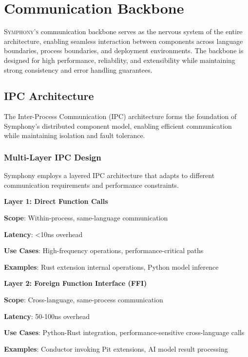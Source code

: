 
\section*{Communication Backbone}

\lettrine{S}{ymphony's} communication backbone serves as the nervous system of the entire architecture, enabling seamless interaction between components across language boundaries, process boundaries, and deployment environments. The backbone is designed for high performance, reliability, and extensibility while maintaining strong consistency and error handling guarantees.

\subsection*{IPC Architecture}

The Inter-Process Communication (IPC) architecture forms the foundation of Symphony's distributed component model, enabling efficient communication while maintaining isolation and fault tolerance.

\subsubsection*{Multi-Layer IPC Design}

Symphony employs a layered IPC architecture that adapts to different communication requirements and performance constraints.

\textbf{Layer 1: Direct Function Calls}
\begin{compactlist}
    \item \textbf{Scope}: Within-process, same-language communication
    \item \textbf{Latency}: <10ns overhead
    \item \textbf{Use Cases}: High-frequency operations, performance-critical paths
    \item \textbf{Examples}: Rust extension internal operations, Python model inference
\end{compactlist}

\textbf{Layer 2: Foreign Function Interface (FFI)}
\begin{compactlist}
    \item \textbf{Scope}: Cross-language, same-process communication
    \item \textbf{Latency}: 50-100ns overhead
    \item \textbf{Use Cases}: Python-Rust integration, performance-sensitive cross-language calls
    \item \textbf{Examples}: Conductor invoking Pit extensions, AI model result processing
\end{compactlist}

